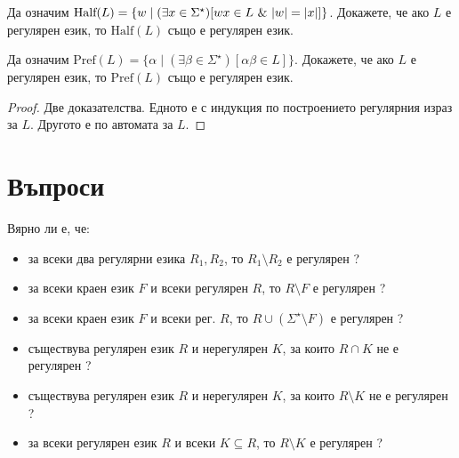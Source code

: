 \begin{problem}
  Да означим $\mbox{Half}(L) = \{w\mid (\exists x \in \Sigma^\star)[wx \in L\ \&\ \vert{w}\vert = \vert{x}\vert]\}$.
  Докажете, че ако $L$ е регулярен език, то $\mbox{Half}(L)$ също е регулярен език.
\end{problem}

\begin{problem}
  Да означим $\mbox{Pref}(L) = \{\alpha \mid (\exists \beta \in \Sigma^\star)[\alpha\beta \in L]\}$.
  Докажете, че ако $L$ е регулярен език, то $\mbox{Pref}(L)$ също е регулярен език.
\end{problem}
\begin{proof}
  Две доказателства. Едното е с индукция по построението регулярния израз за $L$.
  Другото е по автомата за $L$.
\end{proof}


\section{Въпроси}

Вярно ли е, че:
\begin{itemize}
\item
  за всеки два регулярни езика $R_1, R_2$, то $R_1 \setminus R_2$ е регулярен ?
\item
  за всеки краен език $F$ и всеки регулярен $R$, то $R\setminus F$ е регулярен ?
\item
  за всеки краен език $F$ и всеки рег. $R$, то $R\cup (\Sigma^\star \setminus F)$ е регулярен ?
\item
  съществува регулярен език $R$ и нерегулярен $K$, за които $R\cap K$ не е регулярен ?
\item
  съществува регулярен език $R$ и нерегулярен $K$, за които $R\setminus K$ не е регулярен ?
\item
  за всеки регулярен език $R$ и всеки $K \subseteq R$, то $R\setminus K$ е регулярен ?
\end{itemize}
